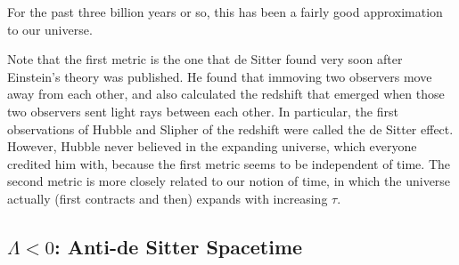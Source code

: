 For the past three billion years or so, this has been a fairly good approximation to our universe.
\begin{leftbar}
  \begin{remark}
    Note that the first metric is the one that de Sitter found very soon after Einstein's theory was published.
    He found that immoving two observers move away from each other, and also calculated the redshift that emerged when those two observers sent light rays between each other.
    In particular, the first observations of Hubble and Slipher of the redshift were called the de Sitter effect.
    However, Hubble never believed in the expanding universe, which everyone credited him with, because the first metric seems to be independent of time.
    The second metric is more closely related to our notion of time, in which the universe actually (first contracts and then) expands with increasing $\tau$.
  \end{remark}
\end{leftbar}

\subsection{\texorpdfstring{$\Lambda < 0$}{Negative Cosmological Constant}: Anti-de Sitter Spacetime}%
\label{sub:anti_de_sitter_spacetime}

